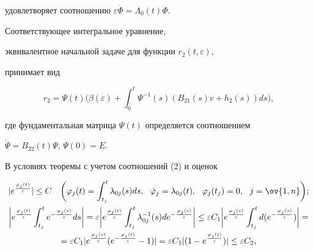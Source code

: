 удовлетворяет соотношению $\varepsilon\Dot\Phi=\Lambda_0(t)\Phi$. 


Соответствующее интегральное уравнение, 


эквивалентное начальной задаче для функции $r_2(t,\varepsilon)$, 


принимает вид 


\begin{equation} 


r_2=\Psi(t)\bigg(\beta(\varepsilon)+\int^t_0 


\Psi^{-1}(s)(B_{21}(s)v+h_2(s))d s\bigg), 


\end{equation} 


где фундаментальная матрица $\Psi(t)$ определяется соотношением 


$\Dot\Psi=B_{22}(t)\Psi$, $\Psi(0)=E$. 


 


В условиях теоремы с учетом соотношений (2) и оценок 


\begin{gather*} 


|e^{\frac{\varphi_j(t)}{\varepsilon}}|\le C\quad 


\bigg(\varphi_j(t)=\int^t_{t_j}\lambda_{0j}(s)d s, 


\ \ \Dot\varphi_j=\lambda_{0j}(t),\ \ \varphi_j(t_j)=0, 


\ \ j=\ov{1,n}\bigg);\\ 


% 


\bigg|e^{\frac{\varphi_j(t)}{\varepsilon}}\int^t_{t_j} 


e^{-\frac{\varphi_j(s)}{\varepsilon}}d s\bigg|=\varepsilon\bigg| 


e^{\frac{\varphi_j(t)}{\varepsilon}}\int^t_{t_j} 


\lambda^{-1}_{0j}(s)d 


e^{-\frac{\varphi_j(s)}{\varepsilon}}\bigg|\le 


\varepsilon C_1\bigg| 


e^{\frac{\varphi_j(s)}{\varepsilon}}\int^t_{t_j}d( 


e^{-\frac{\varphi_j(s)}{\varepsilon}})\bigg|= \\ 


% 


=\varepsilon C_1|e^{\frac{\varphi_j(s)}{\varepsilon}} 


(e^{-\frac{\varphi_j(t)}{\varepsilon}}-1)|=\varepsilon C_1 


|(1-e^{\frac{\varphi_j(t)}{\varepsilon}})|\le 


\varepsilon C_2, 


\end{gather*} 



